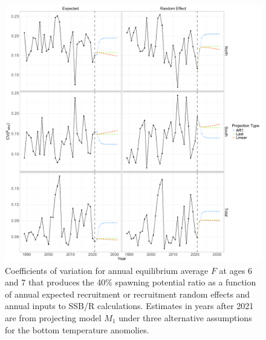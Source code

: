 \documentclass[
]{article}
\begin{document}
\begin{figure}

{\centering \includegraphics[height=0.95\textheight]{proj_F40_CV} 

}

\caption{Coefficients of variation for annual equilibrium average $F$ at ages 6 and 7 that produces the 40\% spawning potential ratio as a function of annual expected recruitment or recruitment random effects and annual inputs to SSB/R calculations. Estimates in years after 2021 are from projecting model $M_1$ under three alternative assumptions for the bottom temperature anomolies.}\label{fig:annual-F40-cvs}
\end{figure}
\end{document}
